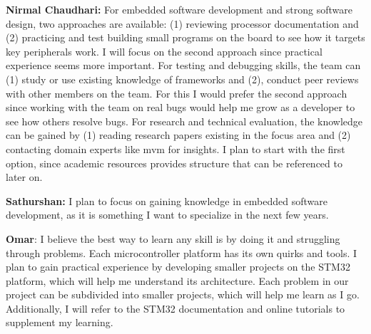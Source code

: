 \begin{enumerate}
  \textbf{Nirmal Chaudhari:} For embedded software development and strong 
  software design, two approaches are available: (1) reviewing processor 
  documentation and (2) practicing and test building small programs on the 
  board to see how it targets key peripherals work. I will focus on the second 
  approach since practical experience seems more important. For testing and 
  debugging skills, the team can (1) study or use existing knowledge of 
  frameworks and (2), conduct peer reviews with other members on the team. 
  For this I would prefer the second approach since working with the team 
  on real bugs would help me grow as a developer to see how others resolve bugs.
  For research and technical evaluation, the knowledge can be gained by (1) 
  reading research papers existing in the focus area and (2) contacting domain 
  experts like mvm for insights. I plan to start with the first option, 
  since academic resources provides structure that can be referenced to later on.
 
  \textbf{Sathurshan:} I plan to focus on gaining knowledge in embedded software
  development, as it is something I want to specialize in the next few years.

  \textbf{Omar}: I believe the best way to learn any skill is by doing it and
  struggling through problems. Each microcontroller platform has its own quirks 
  and tools. I plan to gain practical experience by developing smaller 
  projects on the STM32 platform, which will help me understand its architecture.
  Each problem in our project can be subdivided into smaller projects, which 
  will help me learn as I go. Additionally, I will refer to the STM32 
  documentation and online tutorials to supplement my learning.

\end{enumerate}
